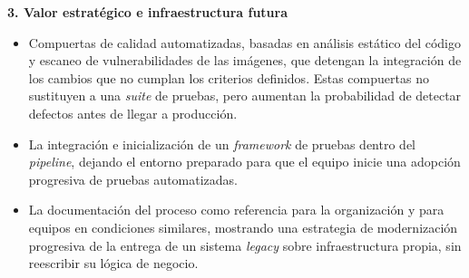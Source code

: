 \textbf{3. Valor estratégico e infraestructura futura}
\begin{itemize}
    \item Compuertas de calidad automatizadas, basadas en análisis estático del código y escaneo de vulnerabilidades de las imágenes, que detengan la integración de los cambios que no cumplan los criterios definidos. Estas compuertas no sustituyen a una \emph{suite} de pruebas, pero aumentan la probabilidad de detectar defectos antes de llegar a producción.
    \item La integración e inicialización de un \emph{framework} de pruebas dentro del \emph{pipeline}, dejando el entorno preparado para que el equipo inicie una adopción progresiva de pruebas automatizadas.
    \item La documentación del proceso como referencia para la organización y para equipos en condiciones similares, mostrando una estrategia de modernización progresiva de la entrega de un sistema \emph{legacy} sobre infraestructura propia, sin reescribir su lógica de negocio.
\end{itemize}
